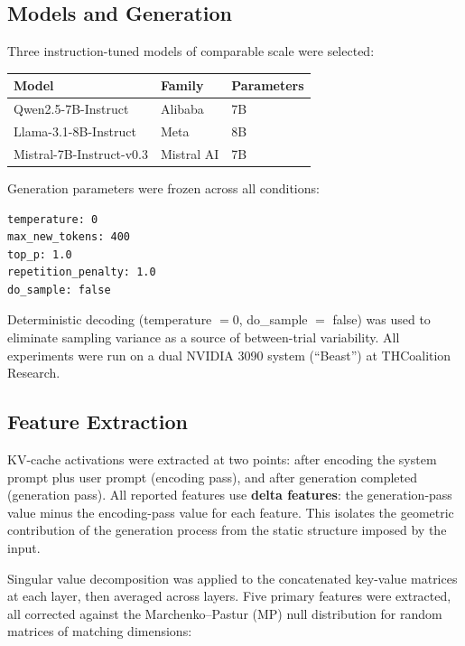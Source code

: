 \documentclass[11pt]{article}
\begin{document}
\subsection{Models and Generation}
\label{sec:models}

Three instruction-tuned models of comparable scale were selected:

\begin{table}[H]
\centering
\begin{tabular}{lll}
\toprule
Model & Family & Parameters \\
\midrule
Qwen2.5-7B-Instruct & Alibaba & 7B \\
Llama-3.1-8B-Instruct & Meta & 8B \\
Mistral-7B-Instruct-v0.3 & Mistral AI & 7B \\
\bottomrule
\end{tabular}
\end{table}

Generation parameters were frozen across all conditions:

\begin{verbatim}
temperature: 0
max_new_tokens: 400
top_p: 1.0
repetition_penalty: 1.0
do_sample: false
\end{verbatim}

Deterministic decoding (temperature $= 0$, do\_sample $=$ false) was used to eliminate sampling variance as a source of between-trial variability. All experiments were run on a dual NVIDIA 3090 system (``Beast'') at THCoalition Research.

\subsection{Feature Extraction}
\label{sec:feature-extraction}

KV-cache activations were extracted at two points: after encoding the system prompt plus user prompt (encoding pass), and after generation completed (generation pass). All reported features use \textbf{delta features}: the generation-pass value minus the encoding-pass value for each feature. This isolates the geometric contribution of the generation process from the static structure imposed by the input.

Singular value decomposition was applied to the concatenated key-value matrices at each layer, then averaged across layers. Five primary features were extracted, all corrected against the Marchenko--Pastur (MP) null distribution for random matrices of matching dimensions:
\end{document}
